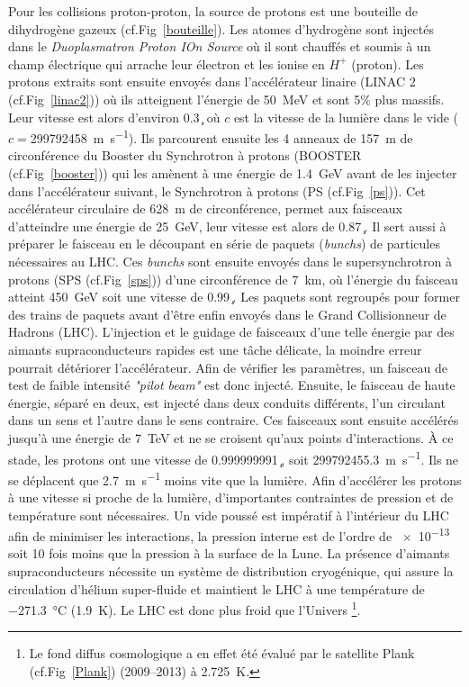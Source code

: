 Pour les collisions proton-proton, la source de protons est une bouteille de dihydrogène gazeux (cf.Fig~\ref{bouteille}). Les atomes d’hydrogène sont injectés dans le \textit{Duoplasmatron Proton IOn Source} où il sont chauffés et soumis à un champ électrique qui arrache leur électron et les ionise en $H^{+}$ (proton). Les protons extraits sont ensuite envoyés dans l'accélérateur linaire (LINAC 2 (cf.Fig~\ref{linac2})) où ils atteignent l'énergie de \SI{50}{\mega\eV} et sont \num{5}\% plus massifs. Leur vitesse est alors d'environ \SI{0.3}{\c} où $c$ est la vitesse de la lumière dans le vide ($c=$\SI{299 792 458}{\meter\per\second}). Ils parcourent ensuite les \num{4} anneaux de \SI{157}{\meter} de circonférence du Booster du Synchrotron à protons (BOOSTER (cf.Fig~\ref{booster})) qui les amènent à une énergie de \SI{1.4}{\giga\eV} avant de les injecter dans l'accélérateur suivant, le Synchrotron à protons (PS (cf.Fig~\ref{ps})). Cet accélérateur circulaire de \SI{628}{\meter} de circonférence, permet aux faisceaux d'atteindre une énergie de \SI{25}{\giga\eV}, leur vitesse est alors de \SI{0.87}{\c}. Il sert aussi à préparer le faisceau en le découpant en série de paquets (\textit{bunchs}) de particules nécessaires au LHC. Ces \textit{bunchs} sont ensuite envoyés dans le supersynchrotron à protons (SPS (cf.Fig~\ref{sps})) d'une circonférence de \SI{7}{\kilo\meter}, où l'énergie du faisceau atteint \SI{450}{\giga\eV} soit une vitesse de \SI{0.99}{\c}. Les paquets sont regroupés pour former des trains de paquets avant d'être enfin envoyés dans le Grand Collisionneur de Hadrons (LHC). L'injection et le guidage de faisceaux d'une telle énergie par des aimants supraconducteurs rapides est une tâche délicate, la moindre erreur pourrait détériorer l'accélérateur. Afin de vérifier les paramètres, un faisceau de test de faible intensité \textit{"pilot beam"} est donc injecté. Ensuite, le faisceau de haute énergie, séparé en deux, est injecté dans deux conduits différents, l'un circulant dans un sens et l'autre dans le sens contraire. Ces faisceaux sont ensuite accélérés jusqu'à une énergie de \SI{7}{\tera\eV} et ne se croisent qu'aux points d'interactions. À ce stade, les protons ont une vitesse de \SI{0.999999991}{\c}, soit \SI{299 792 455,3}{\meter\per\second}. Ils ne se déplacent que \SI{2.7}{\meter\per\second} moins vite que la lumière. Afin d'accélérer les protons à une vitesse si proche de la lumière, d'importantes contraintes de pression et de température sont nécessaires. Un vide poussé est impératif à l'intérieur du LHC afin de minimiser les interactions, la pression interne est de l'ordre de \SI{e-13}{\atm} soit \num{10} fois moins que la pression à la surface de la Lune. La présence d'aimants supraconducteurs nécessite un système de distribution cryogénique, qui assure la circulation d'hélium super-fluide et maintient le LHC à une température de \SI{-271,3}{\celsius} (\SI{1.9}{\kelvin}). Le LHC est donc plus froid que l'Univers \footnote{Le fond diffus cosmologique a en effet été évalué par le satellite Plank (cf.Fig~\ref{Plank}) (\num{2009}--\num{2013}) à \SI{2,725}{\kelvin}.}.

